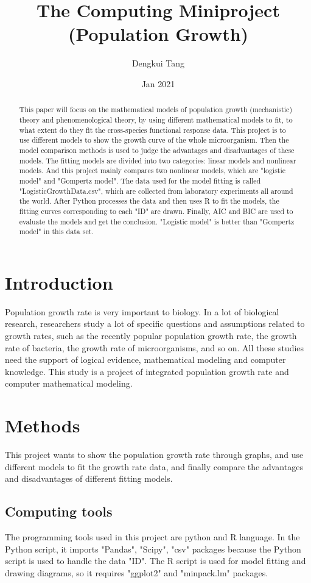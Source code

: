 \documentclass[11pt]{article}
\title{The Computing Miniproject (Population Growth)}
\author{Dengkui Tang}
\date{Jan 2021}
\begin{document}
  \maketitle

  \begin{abstract}
    This paper will focus on the mathematical models of population growth (mechanistic) theory and phenomenological theory, by using different mathematical models to fit, to what extent do they fit the cross-species functional response data. This project is to use different models to show the growth curve of the whole microorganism. Then the model comparison methods is used to judge the advantages and disadvantages of these models. The fitting models are divided into two categories: linear models and nonlinear models. And this project mainly compares two nonlinear models, which are "logistic model" and "Gompertz model". The data used for the model fitting is called "LogisticGrowthData.csv", which are collected from laboratory experiments all around the world. After Python processes the data and then uses R to fit the models, the fitting curves corresponding to each "ID" are drawn. Finally, AIC and BIC are used to evaluate the models and get the conclusion. "Logistic model" is better than "Gompertz model" in this data set. 
  \end{abstract}

  \section{Introduction}
    Population growth rate is very important to biology. In a lot of biological research, researchers study a lot of specific questions and assumptions related to growth rates, such as the recently popular population growth rate, the growth rate of bacteria, the growth rate of microorganisms, and so on. All these studies need the support of logical evidence, mathematical modeling and computer knowledge. This study is a project of integrated population growth rate and computer mathematical modeling.

  \section{Methods}
    This project wants to show the population growth rate through graphs, and use different models to fit the growth rate data, and finally compare the advantages and disadvantages of different fitting models.
    \subsection{Computing tools}
    The programming tools used in this project are python and R language. In the Python script, it imports "Pandas", "Scipy", "csv" packages because the Python script is used to handle the data "ID". The R script is used for model fitting and drawing diagrams, so it requires "ggplot2" and "minpack.lm" packages. 
\end{document}
